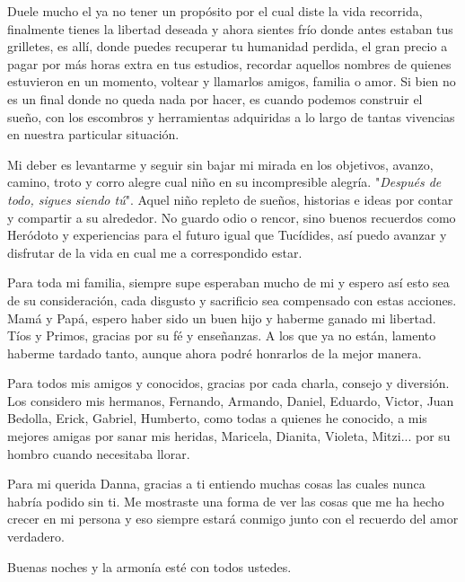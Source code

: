 \documentclass{book}
\begin{document}
	Duele mucho el ya no tener un propósito por el cual diste la vida recorrida, finalmente tienes la libertad deseada y ahora sientes frío donde antes estaban tus grilletes, es allí, donde puedes recuperar tu humanidad perdida, el gran precio a pagar por más horas extra en tus estudios, recordar aquellos nombres de quienes estuvieron en un momento, voltear y llamarlos amigos, familia o amor. Si bien no es un final donde no queda nada por hacer, es cuando podemos construir el sueño, con los escombros y herramientas adquiridas a lo largo de tantas vivencias en nuestra particular situación.\par 
	
	Mi deber es levantarme y seguir sin bajar mi mirada en los objetivos, avanzo, camino, troto y corro alegre cual niño en su incompresible alegría. "\emph{Después de todo, sigues siendo tú}". Aquel niño repleto de sueños, historias e ideas por contar y compartir a su alrededor. No guardo odio o rencor, sino buenos recuerdos como Heródoto y experiencias para el futuro igual que Tucídides, así puedo avanzar y disfrutar de la vida en cual me a correspondido estar.\par 
	
	Para toda mi familia, siempre supe esperaban mucho de mi y espero así esto sea de su consideración, cada disgusto y sacrificio sea compensado con estas acciones. Mamá y Papá, espero haber sido un buen hijo y haberme ganado mi libertad. Tíos y Primos, gracias por su fé y enseñanzas. A los que ya no están, lamento haberme tardado tanto, aunque ahora podré honrarlos de la mejor manera.\par
	
	Para todos mis amigos y conocidos, gracias por cada charla, consejo y diversión. Los considero mis hermanos, Fernando, Armando, Daniel, Eduardo, Victor, Juan Bedolla, Erick, Gabriel, Humberto, como todas a quienes he conocido, a mis mejores amigas por sanar mis heridas, Maricela, Dianita, Violeta, Mitzi... por su hombro cuando necesitaba llorar.\par
	
	Para mi querida Danna, gracias a ti entiendo muchas cosas las cuales nunca habría podido sin ti. Me mostraste una forma de ver las cosas que me ha hecho crecer en mi persona y eso siempre estará conmigo junto con el recuerdo del amor verdadero.\par
	
	Buenas noches y la armonía esté con todos ustedes.\par
	
\end{document}
